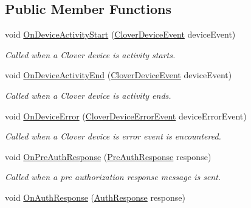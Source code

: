 \subsection*{Public Member Functions}
\begin{DoxyCompactItemize}
\item 
void \hyperlink{interfacecom_1_1clover_1_1remotepay_1_1sdk_1_1_i_clover_connector_listener_a303298434023376030a41a639ceff40b}{On\+Device\+Activity\+Start} (\hyperlink{classcom_1_1clover_1_1remotepay_1_1sdk_1_1_clover_device_event}{Clover\+Device\+Event} device\+Event)
\begin{DoxyCompactList}\small\item\em Called when a Clover device is activity starts. \end{DoxyCompactList}\item 
void \hyperlink{interfacecom_1_1clover_1_1remotepay_1_1sdk_1_1_i_clover_connector_listener_ad9b3f0be387c91e5f7de406b22478e39}{On\+Device\+Activity\+End} (\hyperlink{classcom_1_1clover_1_1remotepay_1_1sdk_1_1_clover_device_event}{Clover\+Device\+Event} device\+Event)
\begin{DoxyCompactList}\small\item\em Called when a Clover device is activity ends. \end{DoxyCompactList}\item 
void \hyperlink{interfacecom_1_1clover_1_1remotepay_1_1sdk_1_1_i_clover_connector_listener_ab342b91dab98cd7ee976973315251291}{On\+Device\+Error} (\hyperlink{classcom_1_1clover_1_1remotepay_1_1sdk_1_1_clover_device_error_event}{Clover\+Device\+Error\+Event} device\+Error\+Event)
\begin{DoxyCompactList}\small\item\em Called when a Clover device is error event is encountered. \end{DoxyCompactList}\item 
void \hyperlink{interfacecom_1_1clover_1_1remotepay_1_1sdk_1_1_i_clover_connector_listener_ad3fd2383d245798a6da5f11bbc3dd5fc}{On\+Pre\+Auth\+Response} (\hyperlink{classcom_1_1clover_1_1remotepay_1_1sdk_1_1_pre_auth_response}{Pre\+Auth\+Response} response)
\begin{DoxyCompactList}\small\item\em Called when a pre authorization response message is sent. \end{DoxyCompactList}\item 
void \hyperlink{interfacecom_1_1clover_1_1remotepay_1_1sdk_1_1_i_clover_connector_listener_a113c61abe6e951817d23bc1561fcb22d}{On\+Auth\+Response} (\hyperlink{classcom_1_1clover_1_1remotepay_1_1sdk_1_1_auth_response}{Auth\+Response} response)

\end{DoxyCompactItemize}
